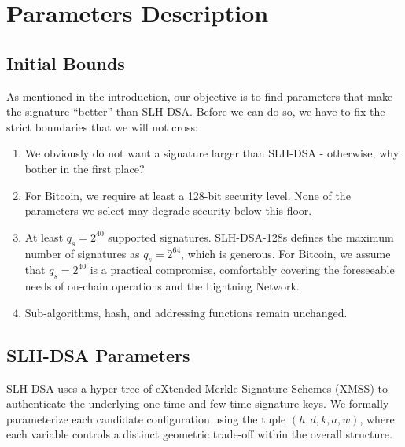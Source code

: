 \section{Parameters Description}

\subsection{Initial Bounds}
As mentioned in the introduction, our objective is to find parameters that make the signature ``better'' than SLH-DSA. Before we can do so, we have to fix the strict boundaries that we will not cross:
\begin{enumerate}
    \item We obviously do not want a signature larger than SLH-DSA - otherwise, why bother in the first place?
    \item For Bitcoin, we require at least a 128-bit security level. None of the parameters we select may degrade security below this floor.
    \item At least $q_{s} = 2^{40}$ supported signatures. SLH-DSA-128s defines the maximum number of signatures as $q_{s} = 2^{64}$, which is generous. For Bitcoin, we assume that $q_{s} = 2^{40}$ is a practical compromise, comfortably covering the foreseeable needs of on-chain operations and the Lightning Network.
    \item Sub-algorithms, hash, and addressing functions remain unchanged.
\end{enumerate}

\subsection{SLH-DSA Parameters}
SLH-DSA uses a hyper-tree of eXtended Merkle Signature Schemes (XMSS) to authenticate the underlying one-time and few-time signature keys. We formally parameterize each candidate configuration using the tuple $(h, d, k, a, w)$, where each variable controls a distinct geometric trade-off within the overall structure.

